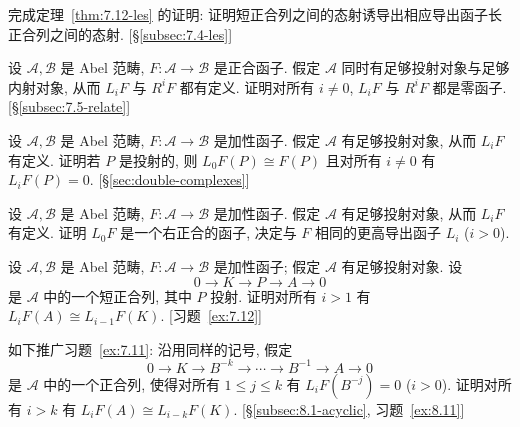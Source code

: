 \begin{prob}\label{ex:7.7}
完成定理~\ref{thm:7.12-les} 的证明: 证明短正合列之间的态射诱导出相应导出函子长正合列之间的态射. [\S\ref{subsec:7.4-les}]
\end{prob}

\begin{prob}\label{ex:7.8}
设 $\mathcal{A},\mathcal{B}$ 是 Abel 范畴, $F:\mathcal{A}\to\mathcal{B}$ 是正合函子. 假定 $\mathcal{A}$ 同时有足够投射对象与足够内射对象, 从而 $L_i F$ 与 $R^i F$ 都有定义. 证明对所有 $i\neq 0$, $L_i F$ 与 $R^i F$ 都是零函子. [\S\ref{subsec:7.5-relate}]
\end{prob}

\begin{prob}\label{ex:7.9}
设 $\mathcal{A},\mathcal{B}$ 是 Abel 范畴, $F:\mathcal{A}\to\mathcal{B}$ 是加性函子. 假定 $\mathcal{A}$ 有足够投射对象, 从而 $L_i F$ 有定义. 证明若 $P$ 是投射的, 则 $L_0 F(P)\cong F(P)$ 且对所有 $i\neq 0$ 有 $L_i F(P)=0$. [\S\ref{sec:double-complexes}]
\end{prob}

\begin{prob}\label{ex:7.10}
设 $\mathcal{A},\mathcal{B}$ 是 Abel 范畴, $F:\mathcal{A}\to\mathcal{B}$ 是加性函子. 假定 $\mathcal{A}$ 有足够投射对象, 从而 $L_i F$ 有定义. 证明 $L_0 F$ 是一个右正合的函子, 决定与 $F$ 相同的更高导出函子 $L_i$ ($i>0$).
\end{prob}

\begin{prob}\label{ex:7.11}
设 $\mathcal{A},\mathcal{B}$ 是 Abel 范畴, $F:\mathcal{A}\to\mathcal{B}$ 是加性函子; 假定 $\mathcal{A}$ 有足够投射对象. 设
\[
0\to K\to P\to A\to 0
\]
是 $\mathcal{A}$ 中的一个短正合列, 其中 $P$ 投射. 证明对所有 $i>1$ 有 $L_i F(A)\cong L_{i-1}F(K)$. [习题~\ref{ex:7.12}]
\end{prob}

\begin{prob}\label{ex:7.12}
如下推广习题~\ref{ex:7.11}: 沿用同样的记号, 假定
\[
0\to K\to B^{-k}\to\cdots\to B^{-1}\to A\to 0
\]
是 $\mathcal{A}$ 中的一个正合列, 使得对所有 $1\le j\le k$ 有 $L_i F(B^{-j})=0$ ($i>0$). 证明对所有 $i>k$ 有 $L_i F(A)\cong L_{i-k}F(K)$. [\S\ref{subsec:8.1-acyclic}, 习题~\ref{ex:8.11}]
\end{prob}

